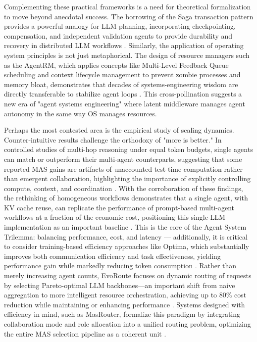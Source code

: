 \documentclass[11pt,a4paper]{article}
\begin{document}
Complementing these practical frameworks is a need for theoretical formalization to move beyond anecdotal success. The borrowing of the Saga transaction pattern provides a powerful analogy for LLM planning, incorporating checkpointing, compensation, and independent validation agents to provide durability and recovery in distributed LLM workflows \cite{arxiv:2503.11951v3}. Similarly, the application of operating system principles is not just metaphorical. The design of resource managers such as the AgentRM, which applies concepts like Multi-Level Feedback Queue scheduling and context lifecycle management to prevent zombie processes and memory bloat, demonstrates that decades of systems-engineering wisdom are directly transferable to stabilize agent loops \cite{arxiv:2603.13110v1}. This cross-pollination suggests a new era of "agent systems engineering" where latent middleware manages agent autonomy in the same way OS manages resources.

Perhaps the most contested area is the empirical study of scaling dynamics. Counter-intuitive results challenge the orthodoxy of "more is better." In controlled studies of multi-hop reasoning under equal token budgets, single agents can match or outperform their multi-agent counterparts, suggesting that some reported MAS gains are artifacts of unaccounted test-time computation rather than emergent collaboration, highlighting the importance of explicitly controlling compute, context, and coordination \cite{arxiv:2604.02460v2}. With the corroboration of these findings, the rethinking of homogeneous workflows demonstrates that a single agent, with KV cache reuse, can replicate the performance of prompt-based multi-agent workflows at a fraction of the economic cost, positioning this single-LLM implementation as an important baseline \cite{arxiv:2601.12307v1}. This is the core of the Agent System Trilemma: balancing performance, cost, and latency \cite{arxiv:2601.02695v1} --- additionally, it is critical to consider training-based efficiency approaches like Optima, which substantially improves both communication efficiency and task effectiveness, yielding performance gain while markedly reducing token consumption \cite{arxiv:2410.08115v2}. Rather than merely increasing agent counts, EvoRoute focuses on dynamic routing of requests by selecting Pareto-optimal LLM backbones---an important shift from naive aggregation to more intelligent resource orchestration, achieving up to 80\% cost reduction while maintaining or enhancing performance \cite{arxiv:2601.02695v1}. Systems designed with efficiency in mind, such as MasRouter, formalize this paradigm by integrating collaboration mode and role allocation into a unified routing problem, optimizing the entire MAS selection pipeline as a coherent unit \cite{arxiv:2502.11133v1}.
\end{document}
